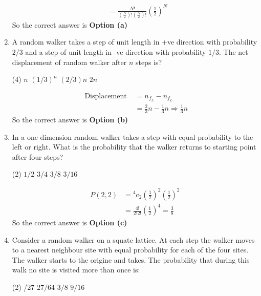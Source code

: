 \begin{enumerate}
\begin{answer}
\begin{align*}
		&=\frac{N !}{\left(\frac{N}{2}\right) !\left(\frac{N}{2}\right) !}\left(\frac{1}{2}\right)^{N}
		\end{align*}
		So the correct answer is \textbf{Option (a)}
	\end{answer}
	\item A random walker takes a step of unit length in +ve direction with probability $2/3$ and a step of unit length in -ve direction with probability $1/3$. The net displacement of random walker after $n$ steps is?
	\begin{tasks}(4)
		\task[\textbf{a.}]$n$
		\task[\textbf{b.}]$(1 / 3)^{n}$
		\task[\textbf{c.}]$(2 / 3) n$
		\task[\textbf{d.}]$2 n$
	\end{tasks}
	\begin{answer}
		\begin{align*}
		\text { Displacement } &=n_{f_{L}}-n_{f_{L}} \\
		&=\frac{2}{3} n-\frac{1}{3} n \Rightarrow \frac{1}{3} n
		\end{align*}
		So the correct answer is \textbf{Option (b)}
	\end{answer}
	\item In a one dimension random walker takes a step with equal probability to the left or right. What is the probability that the walker returns to starting point after four steps?
	\begin{tasks}(2)
		\task[\textbf{a.}]$1 / 2$
		\task[\textbf{b.}]$3 / 4$
		\task[\textbf{c.}]$3 / 8$
		\task[\textbf{d.}] $3 / 16$ 
	\end{tasks}
	\begin{answer}
		\begin{align*}
		P(2,2) &={ }^{4} \mathrm{c}_{2}\left(\frac{1}{2}\right)^{2}\left(\frac{1}{2}\right)^{2} \\
		&=\frac{4 !}{2 ! 2 !}\left(\frac{1}{2}\right)^{4}=\frac{3}{8}
		\end{align*}
		So the correct answer is \textbf{Option (c)}
	\end{answer}
	\item Consider a random walker on a squate lattice. At each step the walker moves to a nearest neighbour site with equal probability for each of the four sites.  The walker starts to the origine and takes. The probability that during this walk no site is visited more than once is:
	\begin{tasks}(2)
		/27
		\task[\textbf{b.}]$27 / 64$
		\task[\textbf{c.}]$3 / 8$
		\task[\textbf{d.}]$9 / 16$ 
	\end{tasks}

\end{enumerate}
